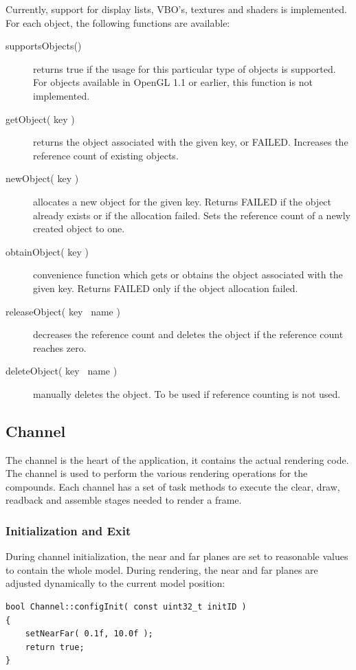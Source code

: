 \documentclass[10pt,a4]{scrartcl}
\begin{document}
Currently, support for display lists, VBO's, textures and shaders is
implemented. For each object, the following functions are available:

\begin{description}
\item[supportsObjects()] returns true if the usage for this particular
  type of objects is supported. For objects available in OpenGL 1.1 or
  earlier, this function is not implemented.
\item[getObject( key )] returns the object associated with the given
  key, or FAILED. Increases the reference count of existing objects.
\item[newObject( key )] allocates a new object for the given
  key. Returns FAILED if the object already exists or if the allocation
  failed. Sets the reference count of a newly created object to one.
\item[obtainObject( key )] convenience function which gets or obtains
  the object associated with the given key. Returns FAILED only if the
  object allocation failed.
\item[releaseObject( key \textbar\ name )] decreases the reference count and
  deletes the object if the reference count reaches zero.
\item[deleteObject( key \textbar\ name )] manually deletes the object. To be
  used if reference counting is not used.
\end{description}


\subsection{Channel}

The channel is the heart of the application, it contains the actual
rendering code. The channel is used to perform the various rendering
operations for the compounds. Each channel has a set of task methods to
execute the clear, draw, readback and assemble stages needed to render a
frame.

\subsubsection{Initialization and Exit}

During channel initialization, the near and far planes are set to
reasonable values to contain the whole model. During rendering, the near
and far planes are adjusted dynamically to the current model position:

{\footnotesize\begin{lstlisting}
bool Channel::configInit( const uint32_t initID )
{
    setNearFar( 0.1f, 10.0f );
    return true;
}
\end{lstlisting}}
\end{document}

